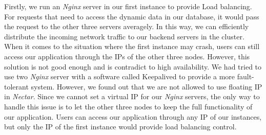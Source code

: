 \documentclass{article}
\begin{document}
Firstly, we run an \textit{Nginx} server in our first instance to provide Load balancing. For requests that need to access the dynamic data in our database, it would pass the request to the other three servers averagely. In this way, we can efficiently distribute the incoming network traffic to our backend servers in the cluster. When it comes to the situation where the first instance may crash, users can still access our application through the IPs of the other three nodes. However, this solution is not good enough and is contradict to high availability. We had tried to use two \textit{Nginx} server with a software called Keepalived to provide a more fault-tolerant system. However, we found out that we are not allowed to use floating IP in \textit{Nectar}. Since we cannot set a virtual IP for our \textit{Nginx} servers, the only way to handle this issue is to let the other three nodes to keep the full functionality of our application. Users can access our application through any IP of our instances, but only the IP of the first instance would provide load balancing control. 
\end{document}
